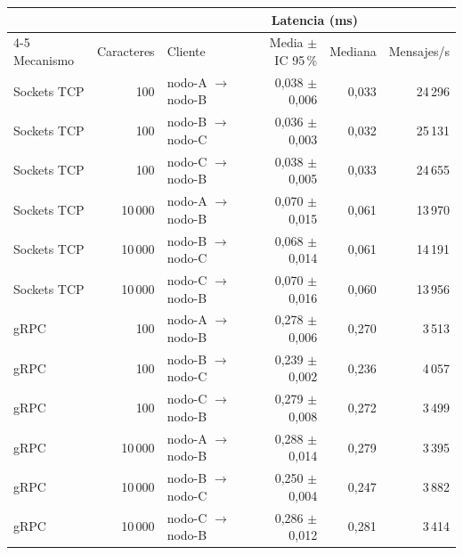 \begin{tabular}{lrlrrr}
\toprule
 & & & \multicolumn{2}{c}{Latencia (ms)} & \\
\cmidrule(lr){4-5}
Mecanismo & Caracteres & Cliente & Media $\pm$ IC 95\,\% & Mediana & Mensajes/s \\
\midrule
Sockets TCP & 100 & nodo-A $\rightarrow$ nodo-B & 0,038 $\pm$ 0,006 & 0,033 & 24\,296 \\
Sockets TCP & 100 & nodo-B $\rightarrow$ nodo-C & 0,036 $\pm$ 0,003 & 0,032 & 25\,131 \\
Sockets TCP & 100 & nodo-C $\rightarrow$ nodo-B & 0,038 $\pm$ 0,005 & 0,033 & 24\,655 \\
Sockets TCP & 10\,000 & nodo-A $\rightarrow$ nodo-B & 0,070 $\pm$ 0,015 & 0,061 & 13\,970 \\
Sockets TCP & 10\,000 & nodo-B $\rightarrow$ nodo-C & 0,068 $\pm$ 0,014 & 0,061 & 14\,191 \\
Sockets TCP & 10\,000 & nodo-C $\rightarrow$ nodo-B & 0,070 $\pm$ 0,016 & 0,060 & 13\,956 \\
\addlinespace
gRPC & 100 & nodo-A $\rightarrow$ nodo-B & 0,278 $\pm$ 0,006 & 0,270 & 3\,513 \\
gRPC & 100 & nodo-B $\rightarrow$ nodo-C & 0,239 $\pm$ 0,002 & 0,236 & 4\,057 \\
gRPC & 100 & nodo-C $\rightarrow$ nodo-B & 0,279 $\pm$ 0,008 & 0,272 & 3\,499 \\
gRPC & 10\,000 & nodo-A $\rightarrow$ nodo-B & 0,288 $\pm$ 0,014 & 0,279 & 3\,395 \\
gRPC & 10\,000 & nodo-B $\rightarrow$ nodo-C & 0,250 $\pm$ 0,004 & 0,247 & 3\,882 \\
gRPC & 10\,000 & nodo-C $\rightarrow$ nodo-B & 0,286 $\pm$ 0,012 & 0,281 & 3\,414 \\
\bottomrule
\end{tabular}
